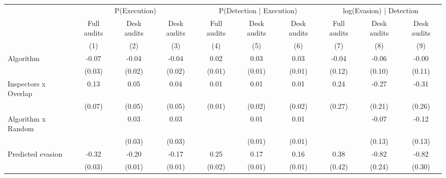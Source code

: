 \begin{tabular}{lccc|ccc|ccc} \toprule
\multicolumn{1}{l}{} & \multicolumn{3}{c}{P(Execution)} & \multicolumn{3}{c}{P(Detection | Execution)} & \multicolumn{3}{c}{log(Evasion) | Detection} \\\cmidrule(lr){2-4}\cmidrule(lr){5-7}\cmidrule(lr){8-10} \multicolumn{1}{l}{} & Full audits & Desk audits & Desk audits & Full audits & Desk audits & Desk audits & Full audits & Desk audits & Desk audits \\ \multicolumn{1}{l}{} & (1) & (2) & (3) & (4) & (5) & (6) & (7) & (8) & (9) \\ \midrule
Algorithm   &       -0.07\sym{**} &       -0.04\sym{*}  &       -0.04\sym{*}  &        0.02\sym{**} &        0.03\sym{***}&        0.03\sym{***}&       -0.04         &       -0.06         &       -0.00         \\
            &      (0.03)         &      (0.02)         &      (0.02)         &      (0.01)         &      (0.01)         &      (0.01)         &      (0.12)         &      (0.10)         &      (0.11)         \\
\addlinespace
Inspectors x Overlap&        0.13\sym{*}  &        0.05         &        0.04         &        0.01         &        0.01         &        0.01         &        0.24         &       -0.27         &       -0.31         \\
            &      (0.07)         &      (0.05)         &      (0.05)         &      (0.01)         &      (0.02)         &      (0.02)         &      (0.27)         &      (0.21)         &      (0.26)         \\
\addlinespace
Algorithm x Random&                     &        0.03         &        0.03         &                     &        0.01         &        0.01         &                     &       -0.07         &       -0.12         \\
            &                     &      (0.03)         &      (0.03)         &                     &      (0.01)         &      (0.01)         &                     &      (0.13)         &      (0.13)         \\
\addlinespace
Predicted evasion&       -0.32\sym{***}&       -0.20\sym{***}&       -0.17\sym{***}&        0.25\sym{***}&        0.17\sym{***}&        0.16\sym{***}&        0.38         &       -0.82\sym{***}&       -0.82\sym{***}\\
            &      (0.03)         &      (0.01)         &      (0.01)         &      (0.02)         &      (0.01)         &      (0.01)         &      (0.42)         &      (0.24)         &      (0.30)         \\

\end{tabular}

